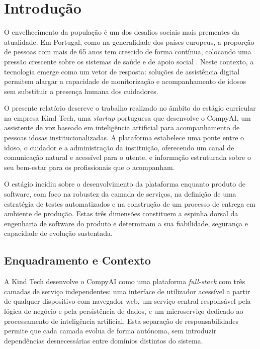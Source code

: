 \chapter{Introdução}
\label{cap:introdução}

O envelhecimento da população é um dos desafios sociais mais prementes da atualidade. Em
Portugal, como na generalidade dos países europeus, a proporção de pessoas com mais de 65 anos
tem crescido de forma contínua, colocando uma pressão crescente sobre os sistemas de saúde e
de apoio social \parencite{ins2023envelhecimento}. Neste contexto, a tecnologia emerge como um
vetor de resposta: soluções de assistência digital permitem alargar a capacidade de
monitorização e acompanhamento de idosos sem substituir a presença humana dos cuidadores.

O presente relatório descreve o trabalho realizado no âmbito do estágio curricular na empresa
Kind Tech, uma \textit{startup} portuguesa que desenvolve o CompyAI, um assistente de voz
baseado em inteligência artificial para acompanhamento de pessoas idosas institucionalizadas.
A plataforma estabelece uma ponte entre o idoso, o cuidador e a administração da instituição,
oferecendo um canal de comunicação natural e acessível para o utente, e informação estruturada
sobre o seu bem-estar para os profissionais que o acompanham.

O estágio incidiu sobre o desenvolvimento da plataforma enquanto produto de software, com
foco na robustez da camada de serviços, na definição de uma estratégia de testes automatizados
e na construção de um processo de entrega em ambiente de produção. Estas três dimensões
constituem a espinha dorsal da engenharia de software do produto e determinam a sua
fiabilidade, segurança e capacidade de evolução sustentada.

\section{Enquadramento e Contexto}
\label{sec:enquadramento}

A Kind Tech desenvolve o CompyAI como uma plataforma \textit{full-stack} com três camadas de
serviço independentes: uma interface de utilizador acessível a partir de qualquer dispositivo
com navegador web, um serviço central responsável pela lógica de negócio e pela persistência
de dados, e um microserviço dedicado ao processamento de inteligência artificial. Esta
separação de responsabilidades permite que cada camada evolua de forma autónoma, sem introduzir
dependências desnecessárias entre domínios distintos do sistema.

